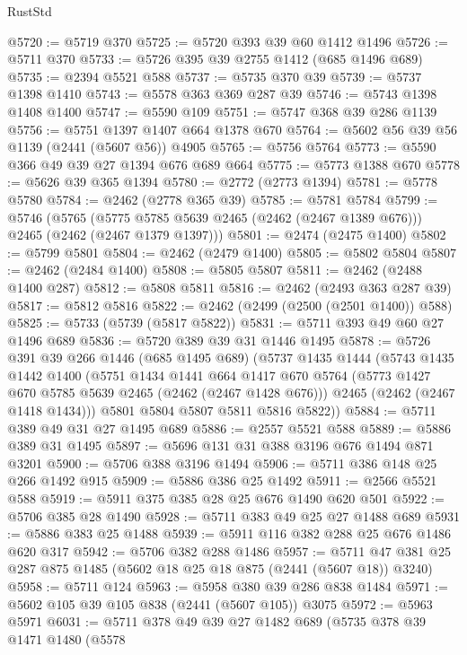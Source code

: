 \begin{lexlean}{RustStd}
\begin{coremodule}
@5720 := @5719 @370
@5725 := @5720 @393 @39 @60 @1412 @1496
@5726 := @5711 @370
@5733 := @5726 @395 @39 @2755 @1412 (@685 @1496 @689)
@5735 := @2394 @5521 @588
@5737 := @5735 @370 @39
@5739 := @5737 @1398 @1410
@5743 := @5578 @363 @369 @287 @39
@5746 := @5743 @1398 @1408 @1400
@5747 := @5590 @109
@5751 := @5747 @368 @39 @286 @1139
@5756 := @5751 @1397 @1407 @664 @1378 @670
@5764 := @5602 @56 @39 @56 @1139 (@2441 (@5607 @56)) @4905
@5765 := @5756 @5764
@5773 := @5590 @366 @49 @39 @27 @1394 @676 @689 @664
@5775 := @5773 @1388 @670
@5778 := @5626 @39 @365 @1394
@5780 := @2772 (@2773 @1394)
@5781 := @5778 @5780
@5784 := @2462 (@2778 @365 @39)
@5785 := @5781 @5784
@5799 := @5746
    (@5765 (@5775 @5785 @5639 @2465 (@2462 (@2467 @1389 @676))) @2465 (@2462 (@2467 @1379 @1397)))
@5801 := @2474 (@2475 @1400)
@5802 := @5799 @5801
@5804 := @2462 (@2479 @1400)
@5805 := @5802 @5804
@5807 := @2462 (@2484 @1400)
@5808 := @5805 @5807
@5811 := @2462 (@2488 @1400 @287)
@5812 := @5808 @5811
@5816 := @2462 (@2493 @363 @287 @39)
@5817 := @5812 @5816
@5822 := @2462 (@2499 (@2500 (@2501 @1400)) @588)
@5825 := @5733 (@5739 (@5817 @5822))
@5831 := @5711 @393 @49 @60 @27 @1496 @689
@5836 := @5720 @389 @39 @31 @1446 @1495
@5878 := @5726
    @391
    @39
    @266
    @1446
    (@685 @1495 @689)
    (@5737
      @1435
      @1444
      (@5743
        @1435
        @1442
        @1400
        (@5751
          @1434
          @1441
          @664
          @1417
          @670
          @5764
          (@5773 @1427 @670 @5785 @5639 @2465 (@2462 (@2467 @1428 @676)))
          @2465
          (@2462 (@2467 @1418 @1434)))
        @5801
        @5804
        @5807
        @5811
        @5816
        @5822))
@5884 := @5711 @389 @49 @31 @27 @1495 @689
@5886 := @2557 @5521 @588
@5889 := @5886 @389 @31 @1495
@5897 := @5696 @131 @31 @388 @3196 @676 @1494 @871 @3201
@5900 := @5706 @388 @3196 @1494
@5906 := @5711 @386 @148 @25 @266 @1492 @915
@5909 := @5886 @386 @25 @1492
@5911 := @2566 @5521 @588
@5919 := @5911 @375 @385 @28 @25 @676 @1490 @620 @501
@5922 := @5706 @385 @28 @1490
@5928 := @5711 @383 @49 @25 @27 @1488 @689
@5931 := @5886 @383 @25 @1488
@5939 := @5911 @116 @382 @288 @25 @676 @1486 @620 @317
@5942 := @5706 @382 @288 @1486
@5957 := @5711 @47 @381 @25 @287 @875 @1485 (@5602 @18 @25 @18 @875 (@2441 (@5607 @18)) @3240)
@5958 := @5711 @124
@5963 := @5958 @380 @39 @286 @838 @1484
@5971 := @5602 @105 @39 @105 @838 (@2441 (@5607 @105)) @3075
@5972 := @5963 @5971
@6031 := @5711
    @378
    @49
    @39
    @27
    @1482
    @689
    (@5735
      @378
      @39
      @1471
      @1480
      (@5578

\end{coremodule}
\end{lexlean}

